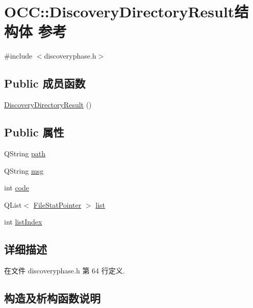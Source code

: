 \hypertarget{struct_o_c_c_1_1_discovery_directory_result}{}\section{O\+CC\+:\+:Discovery\+Directory\+Result结构体 参考}
\label{struct_o_c_c_1_1_discovery_directory_result}


{\ttfamily \#include $<$discoveryphase.\+h$>$}

\subsection*{Public 成员函数}
\begin{DoxyCompactItemize}
\item 
\hyperlink{struct_o_c_c_1_1_discovery_directory_result_aca05ec85ff963edd4e4dabd915b5bbef}{Discovery\+Directory\+Result} ()
\end{DoxyCompactItemize}
\subsection*{Public 属性}
\begin{DoxyCompactItemize}
\item 
Q\+String \hyperlink{struct_o_c_c_1_1_discovery_directory_result_a02465ce29f64dc712834f80ab230cdde}{path}
\item 
Q\+String \hyperlink{struct_o_c_c_1_1_discovery_directory_result_aee3152097fec664a1483095421053a99}{msg}
\item 
int \hyperlink{struct_o_c_c_1_1_discovery_directory_result_ab45e45d64ce61660b538a779222c4166}{code}
\item 
Q\+List$<$ \hyperlink{class_o_c_c_1_1_file_stat_pointer}{File\+Stat\+Pointer} $>$ \hyperlink{struct_o_c_c_1_1_discovery_directory_result_a5f83484aa39a7f209434f5ca67e90e01}{list}
\item 
int \hyperlink{struct_o_c_c_1_1_discovery_directory_result_aa66c4559e0c499c1fdaa7c0d379110c2}{list\+Index}
\end{DoxyCompactItemize}


\subsection{详细描述}


在文件 discoveryphase.\+h 第 64 行定义.



\subsection{构造及析构函数说明}
\mbox{\label{struct_o_c_c_1_1_discovery_directory_result_aca05ec85ff963edd4e4dabd915b5bbef}} 
